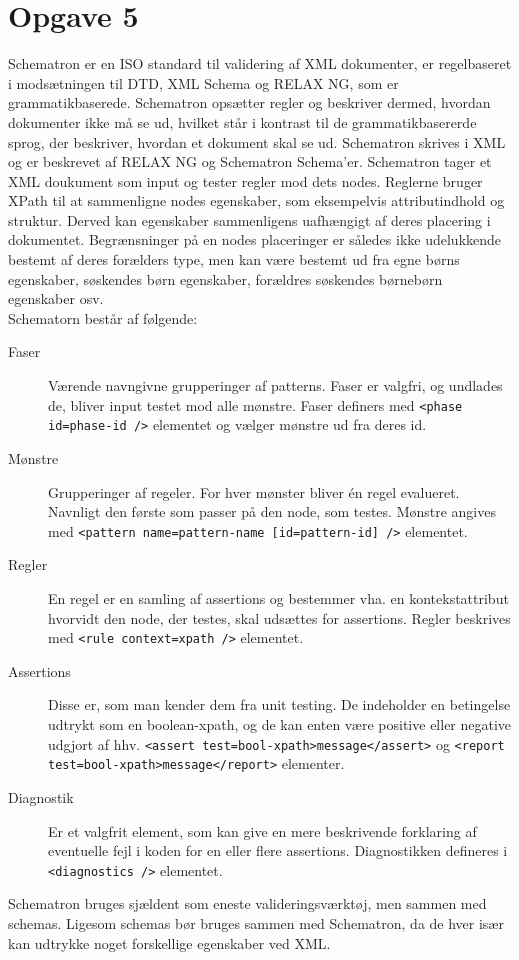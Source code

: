 \documentclass[a4paper,10pt]{article}
\begin{document}
\section*{Opgave 5}
Schematron er en ISO standard til validering af XML dokumenter, er regelbaseret i modsætningen til DTD, XML Schema og RELAX NG, som er grammatikbaserede. Schematron opsætter regler og beskriver dermed, hvordan dokumenter ikke må se ud, hvilket står i kontrast til de grammatikbasererde sprog, der beskriver, hvordan et dokument skal se ud. Schematron skrives i XML og er beskrevet af RELAX NG og Schematron Schema'er. Schematron tager et XML doukument som input og tester regler mod dets nodes. Reglerne bruger XPath til at sammenligne nodes egenskaber, som eksempelvis attributindhold og struktur. Derved kan egenskaber sammenligens uafhængigt af deres placering i dokumentet. Begrænsninger på en nodes placeringer er således ikke udelukkende bestemt af deres forælders type, men kan være bestemt ud fra egne børns egenskaber, søskendes børn egenskaber, forældres søskendes børnebørn egenskaber osv. \\
Schematorn består af følgende:
\begin{description}
  \item[Faser] Værende navngivne grupperinger af patterns. Faser er valgfri, og undlades de, bliver input testet mod alle mønstre. Faser definers med \texttt{<phase id=phase-id />} elementet og vælger mønstre ud fra deres id. 
  \item[Mønstre] Grupperinger af regeler. For hver mønster bliver én regel evalueret. Navnligt den første som passer på den node, som testes. Mønstre angives med \texttt{<pattern name=pattern-name [id=pattern-id] />} elementet. 
  \item[Regler] En regel er en samling af assertions og bestemmer vha. en kontekstattribut  hvorvidt den node, der testes, skal udsættes for assertions. Regler beskrives med \texttt{<rule context=xpath />} elementet.
  \item[Assertions] Disse er, som man kender dem fra unit testing. De indeholder en betingelse udtrykt som en boolean-xpath, og de kan enten være positive eller negative udgjort af hhv. \texttt{<assert test=bool-xpath>message</assert>} og \texttt{<report test=bool-xpath>message</report>} elementer.  
  \item[Diagnostik] Er et valgfrit element, som kan give en mere beskrivende forklaring af eventuelle fejl i koden for en eller flere assertions. Diagnostikken defineres i \texttt{<diagnostics />} elementet. 
\end{description}  
Schematron bruges sjældent som eneste valideringsværktøj, men sammen med schemas. Ligesom schemas bør bruges sammen med Schematron, da de hver især kan udtrykke noget forskellige egenskaber ved XML. 
\end{document}
